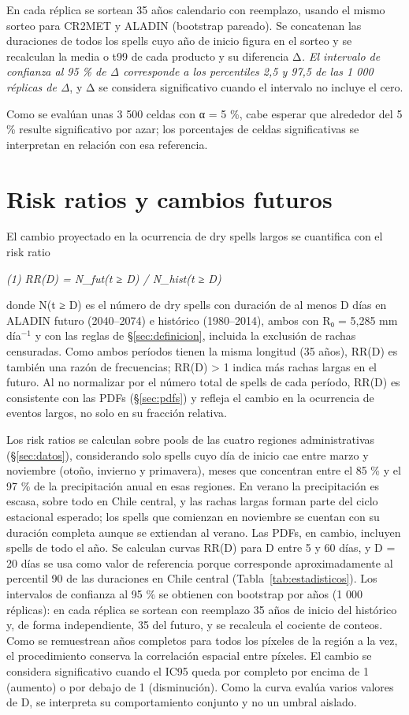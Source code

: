 En cada réplica se sortean 35 años calendario con reemplazo, usando el mismo sorteo para CR2MET y ALADIN (bootstrap pareado). Se concatenan las duraciones de todos los spells cuyo año de inicio figura en el sorteo y se recalculan la media o t99 de cada producto y su diferencia Δ\emph{. El intervalo de confianza al 95 \% de Δ corresponde a los percentiles 2,5 y 97,5 de las 1 000 réplicas de Δ}, y Δ se considera significativo cuando el intervalo no incluye el cero.

Como se evalúan unas 3 500 celdas con α = 5 \%, cabe esperar que alrededor del 5 \% resulte significativo por azar; los porcentajes de celdas significativas se interpretan en relación con esa referencia.

\section{Risk ratios y cambios futuros}\label{sec:rr}

El cambio proyectado en la ocurrencia de dry spells largos se cuantifica con el risk ratio

\emph{(1) RR(D) = N\_fut(t ≥ D) / N\_hist(t ≥ D)}

donde N(t ≥ D) es el número de dry spells con duración de al menos D días en ALADIN futuro (2040--2074) e histórico (1980--2014), ambos con R₀ = 5,285 mm día$^{-1}$ y con las reglas de §\ref{sec:definicion}, incluida la exclusión de rachas censuradas. Como ambos períodos tienen la misma longitud (35 años), RR(D) es también una razón de frecuencias; RR(D) \textgreater{} 1 indica más rachas largas en el futuro. Al no normalizar por el número total de spells de cada período, RR(D) es consistente con las PDFs (§\ref{sec:pdfs}) y refleja el cambio en la ocurrencia de eventos largos, no solo en su fracción relativa.

Los risk ratios se calculan sobre pools de las cuatro regiones administrativas (§\ref{sec:datos}), considerando solo spells cuyo día de inicio cae entre marzo y noviembre (otoño, invierno y primavera), meses que concentran entre el 85 \% y el 97 \% de la precipitación anual en esas regiones. En verano la precipitación es escasa, sobre todo en Chile central, y las rachas largas forman parte del ciclo estacional esperado; los spells que comienzan en noviembre se cuentan con su duración completa aunque se extiendan al verano. Las PDFs, en cambio, incluyen spells de todo el año. Se calculan curvas RR(D) para D entre 5 y 60 días, y D = 20 días se usa como valor de referencia porque corresponde aproximadamente al percentil 90 de las duraciones en Chile central (Tabla~\ref{tab:estadisticos}). Los intervalos de confianza al 95 \% se obtienen con bootstrap por años (1 000 réplicas): en cada réplica se sortean con reemplazo 35 años de inicio del histórico y, de forma independiente, 35 del futuro, y se recalcula el cociente de conteos. Como se remuestrean años completos para todos los píxeles de la región a la vez, el procedimiento conserva la correlación espacial entre píxeles. El cambio se considera significativo cuando el IC95 queda por completo por encima de 1 (aumento) o por debajo de 1 (disminución). Como la curva evalúa varios valores de D, se interpreta su comportamiento conjunto y no un umbral aislado.

